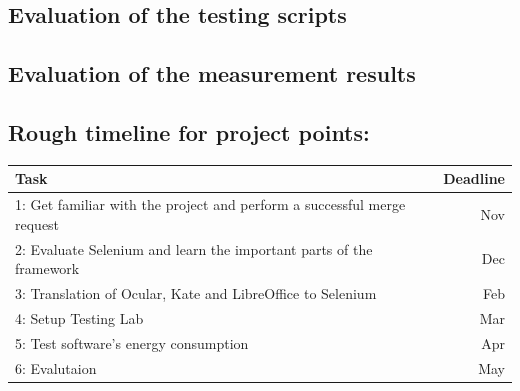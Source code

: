 \documentclass{article}
\begin{document}
\subsection{Evaluation of the testing scripts}
\subsection{Evaluation of the measurement results}

\newpage

\begin{center}
\section*{Rough timeline for project points:}
\begin{tabular}{ | l | r | }
 \hline
 Task & Deadline \\
 \hline\hline
 1: Get familiar with the project and perform a successful merge request   & Nov \\
 \hline
 2: Evaluate Selenium and learn the important parts of the framework & Dec\\
 \hline
 3: Translation of Ocular, Kate and LibreOffice to Selenium & Feb\\
 \hline
 4: Setup Testing Lab & Mar\\
 \hline
 5: Test software's energy consumption & Apr\\
 \hline
 6: Evalutaion & May\\
 \hline
\end{tabular}
\end{center}
\end{document}
